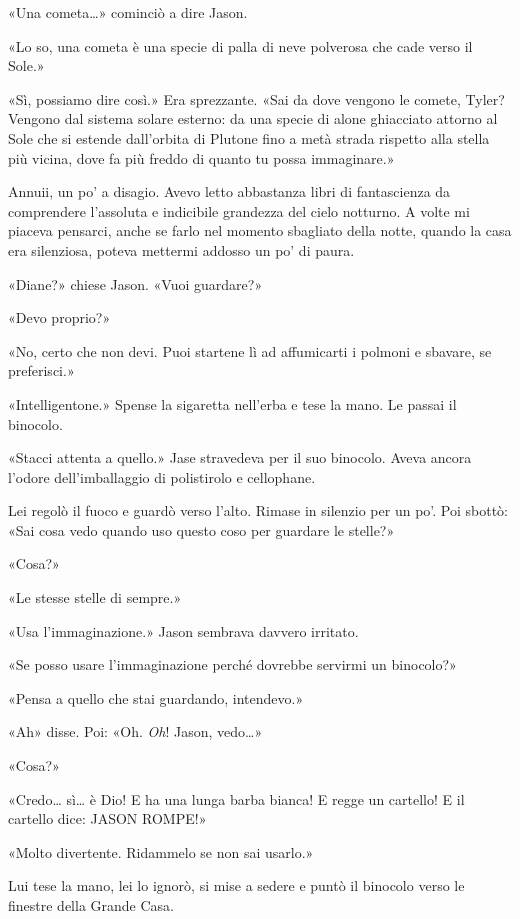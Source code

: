 «Una cometa\ldots» cominciò a dire Jason.

«Lo so, una cometa è una specie di palla di neve polverosa che cade
verso il Sole.»

«Sì, possiamo dire così.» Era sprezzante. «Sai da dove vengono le
comete, Tyler? Vengono dal sistema solare esterno: da una specie di
alone ghiacciato attorno al Sole che si estende dall'orbita di Plutone
fino a metà strada rispetto alla stella più vicina, dove fa più freddo
di quanto tu possa immaginare.»

Annuii, un po' a disagio. Avevo letto abbastanza libri di fantascienza
da comprendere l'assoluta e indicibile grandezza del cielo notturno. A
volte mi piaceva pensarci, anche se farlo nel momento sbagliato della
notte, quando la casa era silenziosa, poteva mettermi addosso un po' di
paura.

«Diane?» chiese Jason. «Vuoi guardare?»

«Devo proprio?»

«No, certo che non devi. Puoi startene lì ad affumicarti i polmoni e
sbavare, se preferisci.»

«Intelligentone.» Spense la sigaretta nell'erba e tese la mano. Le
passai il binocolo.

«Stacci attenta a quello.» Jase stravedeva per il suo binocolo. Aveva
ancora l'odore dell'imballaggio di polistirolo e cellophane.

Lei regolò il fuoco e guardò verso l'alto. Rimase in silenzio per un
po'. Poi sbottò: «Sai cosa vedo quando uso questo coso per guardare le
stelle?»

«Cosa?»

«Le stesse stelle di sempre.»

«Usa l'immaginazione.» Jason sembrava davvero irritato.

«Se posso usare l'immaginazione perché dovrebbe servirmi un binocolo?»

«Pensa a quello che stai guardando, intendevo.»

«Ah» disse. Poi: «Oh. \emph{Oh}! Jason, vedo\ldots»

«Cosa?»

«Credo\ldots{} sì\ldots{} è Dio! E ha una lunga barba bianca! E regge un
cartello! E il cartello dice: J{ASON ROMPE}!»

«Molto divertente. Ridammelo se non sai usarlo.»

Lui tese la mano, lei lo ignorò, si mise a sedere e puntò il binocolo
verso le finestre della Grande Casa.

